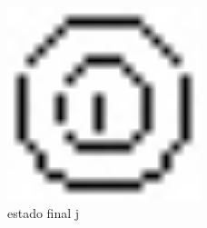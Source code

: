\documentclass{exam}
\begin{document}
\begin{questions}
\begin{figure}[H]
	\begin{center}
		\includegraphics[width=0.5\textwidth]{CIENCIA_DA_COMPUTACAO_Prova2005-utf8_figuras/fig-0037.jpg}
		\caption{estado final j}
	\end{center}
\end{figure}
 

\end{questions}
\end{document}
